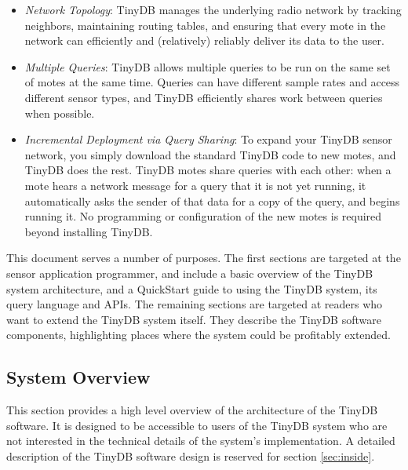 \documentclass[11pt]{article}
\begin{document}
\begin{itemize}
\item {\it Network Topology}: TinyDB manages the underlying radio network by tracking
neighbors, maintaining routing tables, and ensuring that every mote in the
network can efficiently and (relatively) reliably deliver its data to the user.
\item {\it Multiple Queries}: TinyDB allows multiple queries to be run on the same
set of motes at the same time.  Queries can have different sample rates and
access different sensor types, and TinyDB efficiently shares work between
queries when possible.
\item {\it Incremental Deployment via Query Sharing}: To expand your
TinyDB sensor network, you simply download the standard TinyDB code to
new motes, and TinyDB does the rest.  TinyDB motes share queries with
each other: when a mote hears a network message for a query that it is
not yet running, it automatically asks the sender of that data for a
copy of the query, and begins running it.  No programming or
configuration of the new motes is required beyond installing TinyDB.
\end{itemize}

This document serves a number of purposes.  The first sections are
targeted at the sensor application programmer, and include a basic
overview of the TinyDB system architecture, and a QuickStart guide to
using the TinyDB system, its query language and APIs.  The remaining
sections are targeted at readers who want to extend the TinyDB system
itself.  They describe the TinyDB software components, highlighting
places where the system could be profitably extended.

\subsection{System Overview}

This section provides a high level overview of the architecture of the TinyDB software.  It
is designed to be accessible to users of the TinyDB system who are not interested in
the technical details of the system's implementation.  A detailed
description of the TinyDB software design
is reserved for section \ref{sec:inside}.  
\end{document}
